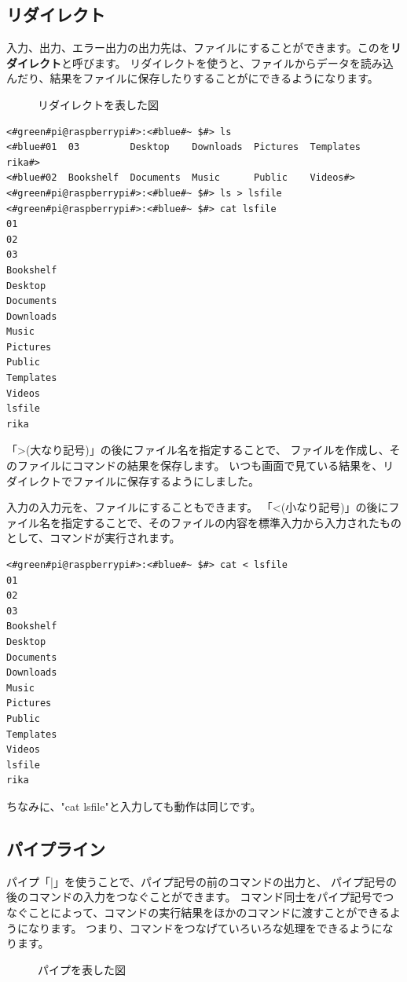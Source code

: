 \documentclass[text03.tex]{subfiles}
\begin{document}
\subsection{リダイレクト}
入力、出力、エラー出力の出力先は、ファイルにすることができます。このを{\bf リダイレクト}と呼びます。
リダイレクトを使うと、ファイルからデータを読み込んだり、結果をファイルに保存したりすることがにできるようになります。
\begin{figure}
    \centering
    
    \caption{リダイレクトを表した図}
    \label{ch03:redirect}
\end{figure}
\begin{lstlisting}[caption=lsの出力をリダイレクトする, label=redirectLs]
<#green#pi@raspberrypi#>:<#blue#~ $#> ls
<#blue#01  03         Desktop    Downloads  Pictures  Templates   rika#>
<#blue#02  Bookshelf  Documents  Music      Public    Videos#>
<#green#pi@raspberrypi#>:<#blue#~ $#> ls > lsfile
<#green#pi@raspberrypi#>:<#blue#~ $#> cat lsfile
01
02
03
Bookshelf
Desktop
Documents
Downloads
Music
Pictures
Public
Templates
Videos
lsfile
rika
\end{lstlisting}

「>(大なり記号)」の後にファイル名を指定することで、
ファイルを作成し、そのファイルにコマンドの結果を保存します。
いつも画面で見ている結果を、リダイレクトでファイルに保存するようにしました。

入力の入力元を、ファイルにすることもできます。
「<(小なり記号)」の後にファイル名を指定することで、そのファイルの内容を標準入力から入力されたものとして、コマンドが実行されます。
\begin{lstlisting}[caption=catコマンドにリダイレクトでファイルを入力する, label=redirectCat]
<#green#pi@raspberrypi#>:<#blue#~ $#> cat < lsfile
01
02
03
Bookshelf
Desktop
Documents
Downloads
Music
Pictures
Public
Templates
Videos
lsfile
rika
\end{lstlisting}

ちなみに、"cat lsfile"と入力しても動作は同じです。

\subsection{パイプライン}\label{sec:pipelne}

パイプ「|」を使うことで、パイプ記号の前のコマンドの出力と、
パイプ記号の後のコマンドの入力をつなぐことができます。
コマンド同士をパイプ記号でつなぐことによって、コマンドの実行結果をほかのコマンドに渡すことができるようになります。
つまり、コマンドをつなげていろいろな処理をできるようになります。
\begin{figure}[h]
    \centering
    
    \caption{パイプを表した図}
    \label{ch03:pipe}
\end{figure}
\end{document}
